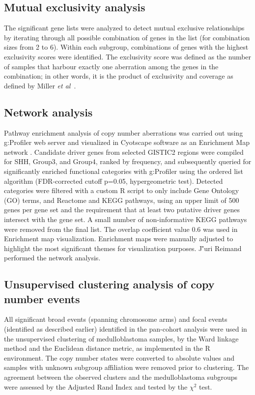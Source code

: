 \subsection{Mutual exclusivity analysis}

The significant gene lists were analyzed to detect mutual exclusive relationships by iterating through all possible combination of genes in the list (for combination sizes from 2 to 6). Within each subgroup, combinations of genes with the highest exclusivity scores were identified. The exclusivity score was defined as the number of samples that harbour exactly one aberration among the genes in the combination; in other words, it is the product of exclusivity and coverage as defined by Miller \emph{et al}\ .

\subsection{Network analysis}

Pathway enrichment analysis of copy number aberrations was carried out using g:Profiler web server  and visualized in Cyotscape software as an Enrichment Map network . Candidate driver genes from selected GISTIC2 regions were compiled for SHH, Group3, and Group4, ranked by frequency, and subsequently queried for significantly enriched functional categories with g:Profiler using the ordered list algorithm (FDR-corrected cutoff p=0.05, hypergeometric test). Detected categories were filtered with a custom R script to only include Gene Ontology (GO) terms, and Reactome and KEGG pathways, using an upper limit of 500 genes per gene set and the requirement that at least two putative driver genes intersect with the gene set. A small number of non-informative KEGG pathways were removed from the final list. The overlap coefficient value 0.6 was used in Enrichment map visualization.  Enrichment maps were manually adjusted to highlight the most significant themes for visualization purposes.  J\''{u}ri Reimand performed the network analysis.

\subsection{Unsupervised clustering analysis of copy number events}

All significant broad events (spanning chromosome arms) and focal events (identified as described earlier) identified in the pan-cohort analysis were used in the unsupervised clustering of medulloblastoma samples, by the Ward linkage method and the Euclidean distance metric, as implemented in the R environment. The copy number states were converted to absolute values and samples with unknown subgroup affiliation were removed prior to clustering. The agreement between the observed clusters and the medulloblastoma subgroups were assessed by the Adjusted Rand Index and tested by the $\chi^2$ test.

